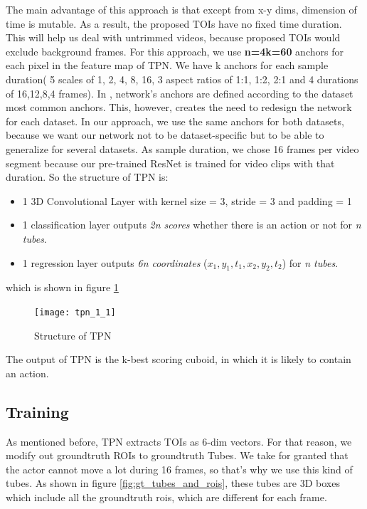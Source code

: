 The main advantage of this approach is that except from x-y dims, dimension of time is mutable. As a result, the proposed TOIs have
no fixed time duration. This will help us deal with untrimmed videos, because proposed TOIs would exclude background frames.
For this approach, we use \textbf{n=4k=60} anchors for each pixel in the feature map of TPN. We have k anchors for each sample
duration( 5 scales of 1, 2, 4, 8, 16, 3 aspect ratios of 1:1, 1:2, 2:1 and 4 durations of 16,12,8,4 frames).
In \cite{DBLP:journals/corr/HouCS17},  network's anchors are defined according to the dataset most common anchors. This, however,
creates the need to redesign the network for each dataset. In our approach, we use the same anchors for both datasets, because we want our network not
to be dataset-specific but to be able to generalize for several datasets. As sample duration, we chose 16 frames per video segment because
our pre-trained ResNet is trained for video clips with that duration.
So the structure of TPN is:
\begin{itemize}
\item 1 3D Convolutional Layer with kernel size = 3, stride = 3 and padding = 1
\item 1 classification layer outputs \textit{2n scores} whether there is an action or not for \textit{n tubes}.
\item 1 regression layer outputs \textit{6n coordinates} ($x_1,y_1,t_1,x_2,y_2,t_2$) for \textit{n tubes}.
\end{itemize}

which is shown in figure \ref{fig:tpn_1_1}
\begin{figure}[h]

  \texttt{[image: tpn\_1\_1]}
  \caption{Structure of TPN}
  \label{fig:tpn_1_1}
\end{figure}

The output of TPN is the k-best scoring cuboid, in which it is likely to contain an action.


\subsection{Training}
As mentioned before, TPN extracts TOIs as 6-dim vectors. For that reason, we modify out groundtruth ROIs to groundtruth Tubes.
We take for granted that the actor cannot move a lot during 16 frames, so that's why we use this kind of tubes. As shown 
in figure \ref{fig:gt_tubes_and_rois}, these tubes are 3D boxes which include all the groundtruth rois, which are different
for each frame.

